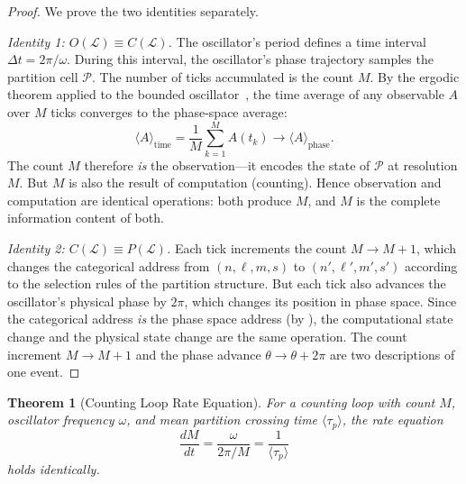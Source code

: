 \documentclass[twocolumn,10pt]{article}
\newtheorem{theorem}{Theorem}[section]
\theoremstyle{definition}
\newcommand{\taup}{\tau_p}
\begin{document}
\begin{proof}
We prove the two identities separately.

\emph{Identity 1: $O(\mathcal{L}) \equiv C(\mathcal{L})$.} The oscillator's period defines a time interval $\Delta t = 2\pi/\omega$. During this interval, the oscillator's phase trajectory samples the partition cell $\mathcal{P}$. The number of ticks accumulated is the count $M$. By the ergodic theorem applied to the bounded oscillator~\cite{arnold1978}, the time average of any observable $A$ over $M$ ticks converges to the phase-space average:
\[
\langle A \rangle_{\text{time}} = \frac{1}{M} \sum_{k=1}^{M} A(t_k) \to \langle A \rangle_{\text{phase}}.
\]
The count $M$ therefore \emph{is} the observation---it encodes the state of $\mathcal{P}$ at resolution $M$. But $M$ is also the result of computation (counting). Hence observation and computation are identical operations: both produce $M$, and $M$ is the complete information content of both.

\emph{Identity 2: $C(\mathcal{L}) \equiv P(\mathcal{L})$.} Each tick increments the count $M \to M+1$, which changes the categorical address from $(n, \ell, m, s)$ to $(n', \ell', m', s')$ according to the selection rules of the partition structure. But each tick also advances the oscillator's physical phase by $2\pi$, which changes its position in phase space. Since the categorical address \emph{is} the phase space address (by ), the computational state change and the physical state change are the same operation. The count increment $M \to M+1$ and the phase advance $\theta \to \theta + 2\pi$ are two descriptions of one event.
\end{proof}

\begin{theorem}[Counting Loop Rate Equation]
\label{thm:rate-equation}
For a counting loop with count $M$, oscillator frequency $\omega$, and mean partition crossing time $\langle \taup \rangle$, the rate equation
\begin{equation}
\frac{dM}{dt} = \frac{\omega}{2\pi / M} = \frac{1}{\langle \taup \rangle}
\label{eq:rate-equation}
\end{equation}
holds identically.
\end{theorem}
\end{document}
